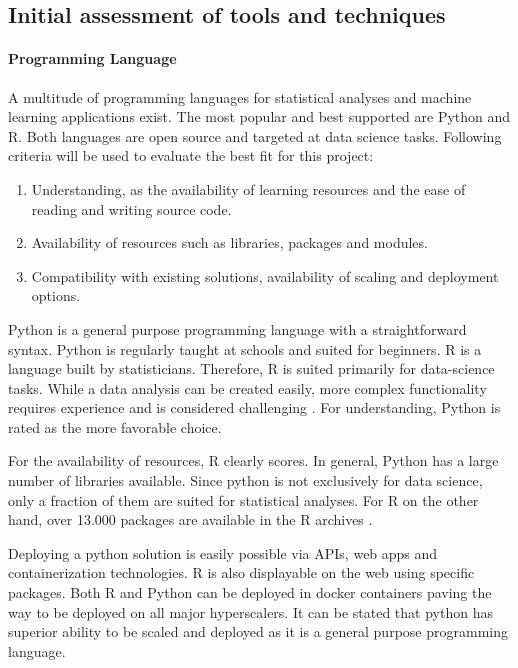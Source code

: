 \subsection{Initial assessment of tools and techniques}

\paragraph{Programming Language}
A multitude of programming languages for statistical analyses and machine learning applications exist. The most popular and best supported are Python and R. Both languages are open source and targeted at data science tasks.
Following criteria will be used to evaluate the best fit for this project:
\begin{enumerate}
\item Understanding, as the availability of learning resources and the ease of reading and writing source code.
\item Availability of resources such as libraries, packages and modules.
\item Compatibility with existing solutions, availability of scaling and deployment options.
\end{enumerate}

Python is a general purpose programming language with a straightforward syntax. Python is regularly taught at schools and suited for beginners. R is a language built by statisticians. Therefore, R is suited primarily for data-science tasks. While a data analysis can be created easily, more complex functionality requires experience and is considered challenging \cite{pythonVsR}. For understanding, Python is rated as the more favorable choice.

For the availability of resources, R clearly scores. In general, Python has a large number of libraries available. Since python is not exclusively for data science, only a fraction of them are suited for statistical analyses. For R on the other hand, over 13.000 packages are available in the R archives \cite{pythonVsR}.

Deploying a python solution is easily possible via APIs, web apps and containerization technologies. R is also displayable on the web using specific packages. Both R and Python can be deployed in docker containers \cite{rDocker} \cite{pythonDocker} paving the way to be deployed on all major hyperscalers.
It can be stated that python has superior ability to be scaled and deployed as it is a general purpose programming language. 

